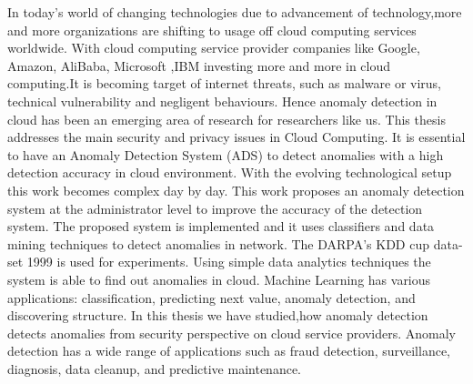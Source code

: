 In today’s world of changing technologies due to advancement of technology,more and more organizations are shifting to usage off cloud computing services worldwide. With cloud computing service provider companies like Google, Amazon, AliBaba, Microsoft ,IBM  investing more and more in cloud computing.It is becoming target of internet threats, such as malware or virus, technical vulnerability and negligent behaviours.
Hence anomaly detection in cloud has been an emerging area of research for researchers like us. This thesis  addresses the main security and privacy issues in Cloud Computing. It is essential to have an Anomaly Detection System (ADS) to detect anomalies with a high detection accuracy in cloud environment. With the evolving technological setup this work becomes complex day by day. This work proposes an anomaly detection system at the administrator level to improve the accuracy of the detection system. 
The proposed system is implemented and it uses classifiers and data mining techniques to detect anomalies in network. The DARPA’s KDD cup data-set 1999 is used for experiments.  Using simple data analytics techniques the system is able to find out anomalies in cloud.
Machine Learning has various  applications: classification, predicting next value, anomaly detection, and discovering structure. In this thesis we have studied,how anomaly detection detects anomalies from security perspective on cloud service providers. Anomaly detection has a wide range of applications such as fraud detection, surveillance, diagnosis, data cleanup, and predictive maintenance.